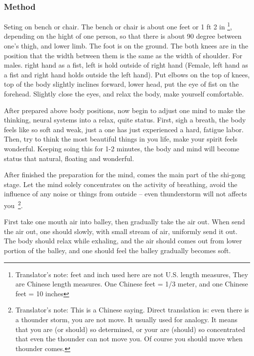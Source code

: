 \subsubsection{Method}
Seting on bench or chair. The bench or chair is about one feet or 1 ft 2 in \footnote{Translator's note:
feet and inch used here are not U.S. length measures, They are Chinese length measures.
One Chinese feet = 1/3 meter, and one Chinese feet = 10 inches}, depending on the hight of one person, so that
there is about 90 degree between one's thigh, and lower limb. The foot is on the ground. The both knees are in
the position that the width between them is the same as the width of shoulder. For males. right hand as a fist,
left is hold outside of right hand (Female, left hand as a fist and right hand holds outside the left hand). Put
elbows on the top of knees, top of the body slightly inclines forward, lower head, put the eye of fist on the
forehead. Slightly close the eyes, and relax the body, make yourself comfortable.
\vspace{0.15 in}

After prepared above body positions, now begin to adjust one mind to make the thinking, neural systems into
a relax, quite status. First, sigh a breath, the body feels like so soft and weak, just a one has just experienced
a hard, fatigue labor. Then, try to think the most beautiful things in you life, make your spirit feels wonderful. 
Keeping soing this for 1-2 minutes, the body and mind will become status that natural, floating and wonderful. 

\vspace{0.15 in}

After finished the preparation for the mind, comes the main part of the shi-gong stage. Let the mind solely
concentrates on the activity of breathing, avoid the influence of any noise or things from outside -- 
even thunderstorm will not affects you~\footnote{Translator's note: This is a Chinese saying. Direct translation
is: even there is a thounder storm, you are not move. It usually used for analogy. It means that you are (or should)
so determined, or your are (should) so concentrated that even the thounder can not move you. Of course you should
move when thounder comes.}.
\vspace {0.05 in}

First take one mouth air into balley, then gradually take the air out. When send the
air out, one should slowly, with small stream of air, uniformly send it out. The body should relax while exhaling, 
and the air should comes out from lower portion of the balley, and one should feel the balley gradually
becomes soft.
\vspace {0.05 in}

